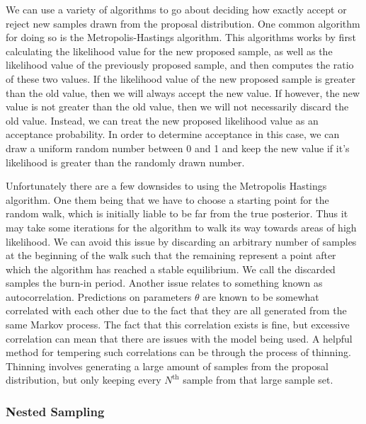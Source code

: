 %
%

We can use a variety of algorithms to go about deciding how exactly accept or reject new samples drawn from the proposal distribution. One common algorithm for doing so is the Metropolis-Hastings algorithm. This algorithms works by first calculating the likelihood value for the new proposed sample, as well as the likelihood value of the previously proposed sample, and then computes the ratio of these two values. If the likelihood value of the new proposed sample is greater than the old value, then we will always accept the new value. If however, the new value is not greater than the old value, then we will not necessarily discard the old value. Instead, we can treat the new proposed likelihood value as an acceptance probability. In order to determine acceptance in this case, we can draw a uniform random number between 0 and 1 and keep the new value if it's likelihood is greater than the randomly drawn number.

%
%
Unfortunately there are a few downsides to using the Metropolis Hastings algorithm. One them being that we have to choose a starting point for the random walk, which is initially liable to be far from the true posterior. Thus it may take some iterations for the algorithm to walk its way towards areas of high likelihood. We can avoid this issue by discarding an arbitrary number of samples at the beginning of the walk such that the remaining represent a point after which the algorithm has reached a stable equilibrium. We call the discarded samples the burn-in period. Another issue relates to something known as autocorrelation. Predictions on parameters $\theta$ are known to be somewhat correlated with each other due to the fact that they are all generated from the same Markov process. The fact that this correlation exists is fine, but excessive correlation can mean that there are issues with the model being used. A helpful method for tempering such correlations can be through the process of thinning. Thinning involves generating a large amount of samples from the proposal distribution, but only keeping every $N^{\textrm{th}}$ sample from that large sample set. 

%
%

%
\subsubsection{Nested Sampling}

